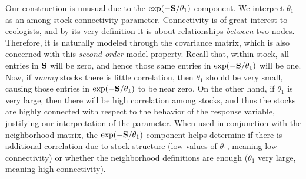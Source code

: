 \documentclass[11pt, titlepage]{article}\usepackage[]{graphicx}\usepackage[]{color}
\begin{document}
\begin{spacing}{1.9}
\begin{flushleft}
Our construction is unusual due to the $\exp(-\mathbf{S}/\theta_1)$ component.  We interpret $\theta_1$ as an among-stock connectivity parameter.  Connectivity is of great interest to ecologists, and by its very definition it is about relationships \emph{between} two nodes.  Therefore, it is naturally modeled through the covariance matrix, which is also concerned with this \emph{second-order} model property.  Recall that, within stock, all entries in $\mathbf{S}$ will be zero, and hence those same entries in $\exp(-\mathbf{S}/\theta_1)$ will be one.  Now, if \emph{among} stocks there is little correlation, then $\theta_1$ should be very small, causing those entries in $\exp(-\mathbf{S}/\theta_1)$ to be near zero.  On the  other hand, if $\theta_1$ is very large, then there will be high correlation among stocks, and thus the stocks are highly connected with respect to the behavior of the response variable, justifying our interpretation of the parameter.  When used in conjunction with the neighborhood matrix, the $\exp(-\mathbf{S}/\theta_1)$ component helps determine if there is additional correlation due to stock structure (low values of $\theta_1$, meaning low connectivity) or whether the neighborhood definitions are enough ($\theta_1$ very large, meaning high connectivity).


\end{flushleft}
\end{spacing}
\end{document}
